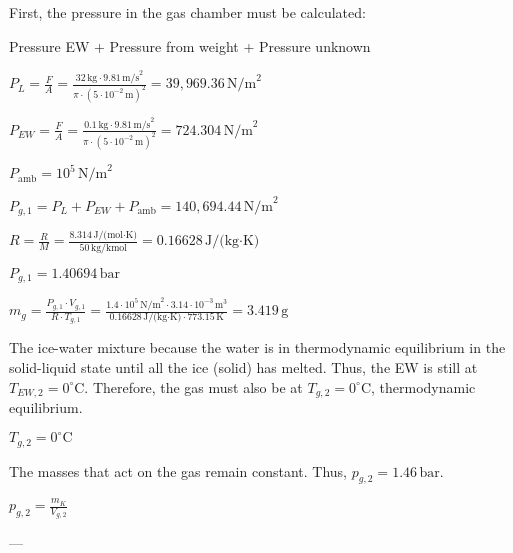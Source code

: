 First, the pressure in the gas chamber must be calculated:  

Pressure EW + Pressure from weight + Pressure unknown  

\( P_L = \frac{F}{A} = \frac{32 \, \text{kg} \cdot 9.81 \, \text{m/s}^2}{\pi \cdot (5 \cdot 10^{-2} \, \text{m})^2} = 39,969.36 \, \text{N/m}^2 \)  

\( P_{EW} = \frac{F}{A} = \frac{0.1 \, \text{kg} \cdot 9.81 \, \text{m/s}^2}{\pi \cdot (5 \cdot 10^{-2} \, \text{m})^2} = 724.304 \, \text{N/m}^2 \)  

\( P_{\text{amb}} = 10^5 \, \text{N/m}^2 \)  

\( P_{g,1} = P_L + P_{EW} + P_{\text{amb}} = 140,694.44 \, \text{N/m}^2 \)  

\( R = \frac{R}{M} = \frac{8.314 \, \text{J/(mol·K)}}{50 \, \text{kg/kmol}} = 0.16628 \, \text{J/(kg·K)} \)  

\( P_{g,1} = 1.40694 \, \text{bar} \)  

\( m_g = \frac{P_{g,1} \cdot V_{g,1}}{R \cdot T_{g,1}} = \frac{1.4 \cdot 10^5 \, \text{N/m}^2 \cdot 3.14 \cdot 10^{-3} \, \text{m}^3}{0.16628 \, \text{J/(kg·K)} \cdot 773.15 \, \text{K}} = 3.419 \, \text{g} \)

The ice-water mixture because the water is in thermodynamic equilibrium in the solid-liquid state until all the ice (solid) has melted. Thus, the EW is still at \( T_{EW,2} = 0^\circ \text{C} \). Therefore, the gas must also be at \( T_{g,2} = 0^\circ \text{C} \), thermodynamic equilibrium.  

\( T_{g,2} = 0^\circ \text{C} \)  

The masses that act on the gas remain constant. Thus, \( p_{g,2} = 1.46 \, \text{bar} \).  

\( p_{g,2} = \frac{m_K}{V_{g,2}} \)  

---